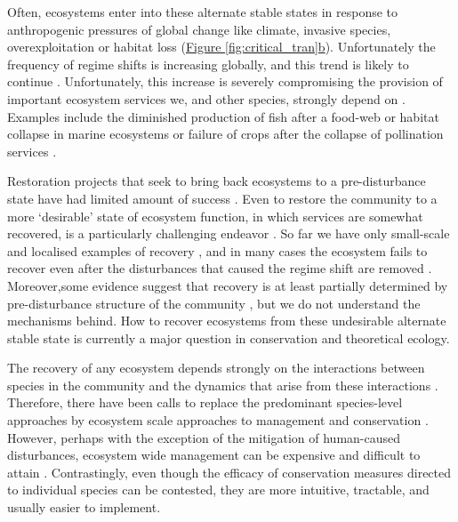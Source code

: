 \documentclass[a4paper]{article}
\begin{document}
Often, ecosystems enter into these alternate stable states in response to anthropogenic pressures of global change like climate, invasive species, overexploitation or habitat loss (\hyperref[fig:critical_tran]{Figure \ref{fig:critical_tran}b}).
Unfortunately the frequency of regime shifts is increasing globally, and this trend is likely to continue \autocite{Hughes2005}.
Unfortunately, this increase is severely compromising the provision of important ecosystem services we, and other species, strongly depend on \autocite{Hughes2013a}.
Examples include the diminished production of fish after a food-web or habitat collapse in marine ecosystems \autocite{Hare2000, Daskalov2007, MacNeil2015} or failure of crops after the collapse of pollination services \autocite{Pauw2007,Lever2014}.

Restoration projects that seek to bring back ecosystems to a pre-disturbance state have had limited amount of success \autocite{Suding2004}.
Even to restore the community to a more `desirable' state of ecosystem function, in which services are somewhat recovered, is a particularly challenging endeavor \autocite{Graham2013a}.
So far we have only small-scale and localised examples of recovery \autocite{Carpenter2006a, Stockwell2009}, and in many cases the ecosystem fails to recover even after the disturbances that caused the regime shift are removed \autocite{Hughes2005}.
Moreover,some evidence suggest that recovery is at least partially determined by pre-disturbance structure of the community \autocite{Graham2015}, but we do not understand the mechanisms behind.
How to recover ecosystems from these undesirable alternate stable state is currently a major question in conservation and theoretical ecology.

The recovery of any ecosystem depends strongly on the interactions between species in the community and the dynamics that arise from these interactions \autocite{VandeKoppel1997, Suding2004}.
Therefore, there have been calls to replace the predominant species-level approaches by ecosystem scale approaches to management and conservation \autocite{Suding2009,Sasaki2015}.
However, perhaps with the exception of the mitigation of human-caused disturbances, ecosystem wide management can be expensive and difficult to attain \autocite{Browman2004, Suding2004}.
Contrastingly, even though the efficacy of conservation measures directed to individual species can be contested, they are more intuitive, tractable, and usually easier to implement.
\end{document}
